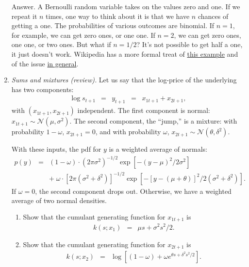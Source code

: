 \documentclass[11pt]{article}
\begin{document}
\begin{enumerate}
Answer. A Bernoulli random variable takes on the values zero and one.
If we repeat it $n$ times, one way to think about it is that
we have $n$ chances of getting a one.
The probabilities of various outcomes are binomial.
If $n=1$, for example, we can get zero ones, or one one.
If $n=2$, we can get zero ones, one one, or two ones.
But what if $n=1/2$?
It's not possible to get half a one, it just doesn't work.
Wikipedia has a more formal treat of
\href{http://en.wikipedia.org/wiki/Indecomposable_distribution}{this example}
and of the issue
\href{http://en.wikipedia.org/wiki/Infinite_divisibility_(probability)}
{in general}.


\item {\it Sums and mixtures (review).\/}
Let us say that the log-price of the underlying has two components:
\begin{eqnarray*}
    \log s_{t+1} &=& y_{t+1} \;\;=\;\; x_{1t+1} + x_{2t+1},
\end{eqnarray*}
with $( x_{1t+1}, x_{2t+1})$ independent.
The first component is normal:
$ x_{1t+1} \sim \mathcal{N}(\mu,\sigma^2)$.
The second component, the ``jump,'' is a mixture:
with probability $1-\omega$, $ x_{2t+1} = 0$,
and with probability $\omega$,
$ x_{2t+1} \sim \mathcal{N}(\theta,\delta^2)$.

With these inputs, the pdf for $y$ is a weighted average of normals:
\begin{eqnarray}
    p(y) &=& (1-\omega) \cdot ( 2 \pi \sigma^2)^{-1/2} \exp[ - (y-\mu)^2/2\sigma^2]
            \nonumber \\
    && + \; \omega \cdot [ 2 \pi (\sigma^2+\delta^2)]^{-1/2}
            \exp[ - [y-(\mu+\theta)]^2/2(\sigma^2 + \delta^2)] .
            \label{eq:bernoulli-mixture}
\end{eqnarray}
If $\omega = 0$, the second component drops out.
Otherwise, we have a weighted average of two normal densities.

\begin{enumerate}
\item Show that the cumulant generating function for $x_{1t+1}$ is
\begin{eqnarray*}
    k (s; x_1) &=&  \mu s + \sigma^2 s^2 / 2 .
\end{eqnarray*}

\item Show that the cumulant generating function for $x_{2t+1}$ is
\begin{eqnarray*}
    k (s; x_2) &=& \log \left[ (1-\omega) + \omega e^{ \theta s + \delta^2 s^2 / 2 }
            \right] .
\end{eqnarray*}


\end{enumerate}
\end{enumerate}
\end{document}
